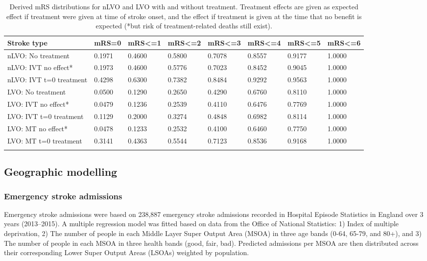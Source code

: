 \begin{minipage}{\textwidth}
\begin{longtable}[]{@{}llllllll@{}}
\caption{Derived mRS distributions for nLVO and LVO with and without treatment. Treatment effects are given as expected effect if treatment were given at time of stroke onset, and the effect if treatment is given at the time that no benefit is expected (*but risk of treatment-related deaths still exist).}\\
\toprule
\endhead
Stroke type & mRS=0 & mRS\textless=1 & mRS\textless=2 & mRS\textless=3 & mRS\textless=4 & mRS\textless=5 & mRS\textless=6\tabularnewline
\midrule
nLVO: No treatment & 0.1971 & 0.4600 & 0.5800 & 0.7078 & 0.8557 & 0.9177 & 1.0000\tabularnewline
nLVO: IVT no effect* & 0.1973 & 0.4600 & 0.5776 & 0.7023 & 0.8452 & 0.9045 & 1.0000\tabularnewline
nLVO: IVT t=0 treatment & 0.4298 & 0.6300 & 0.7382 & 0.8484 & 0.9292 & 0.9563 & 1.0000\tabularnewline
LVO: No treatment & 0.0500 & 0.1290 & 0.2650 & 0.4290 & 0.6760 & 0.8110 & 1.0000\tabularnewline
LVO: IVT no effect* & 0.0479 & 0.1236 & 0.2539 & 0.4110 & 0.6476 & 0.7769 & 1.0000\tabularnewline
LVO: IVT t=0 treatment & 0.1129 & 0.2000 & 0.3274 & 0.4848 & 0.6982 & 0.8114 & 1.0000\tabularnewline
LVO: MT no effect* & 0.0478 & 0.1233 & 0.2532 & 0.4100 & 0.6460 & 0.7750 & 1.0000\tabularnewline
LVO: MT t=0 treatment & 0.3141 & 0.4363 & 0.5544 & 0.7123 & 0.8536 & 0.9168 & 1.0000\tabularnewline
\bottomrule
\label{tab:mrs_dists}
\end{longtable}
\end{minipage}

\subsection{Geographic modelling}

\subsubsection{Emergency stroke admissions}

Emergency stroke admissions were based on 238,887 emergency stroke admissions recorded in Hospital Episode Statistics in England over 3 years (2013–2015). A multiple regression model was fitted based on data from the Office of National Statistics: 1) Index of multiple deprivation, 2) The number of people in each Middle Layer Super Output Area (MSOA) in three age bands (0-64, 65-79, and 80+), and 3) The number of people in each MSOA in three health bands (good, fair, bad). Predicted admissions per MSOA are then distributed across their corresponding Lower Super Output Areas (LSOAs) weighted by population.

